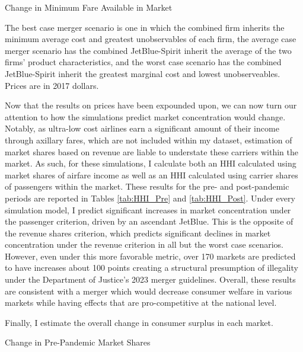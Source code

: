 \documentclass{article}
\begin{document}
    \begin{table}
        \caption{Change in Minimum Fare Available in Market}
        \label{tab:MinimumPrice}
                \vspace{-15mm}
        \begin{center}
            
        \end{center}
        \footnotesize{The best case merger scenario is one in which the combined firm inherits the minimum average cost and greatest unobservables of each firm, the average case merger scenario has the combined JetBlue-Spirit inherit the average of the two firms' product characteristics, and the worst case scenario has the combined JetBlue-Spirit inherit the greatest marginal cost and lowest unobserveables. Prices are in 2017 dollars. }
    \end{table}    

    Now that the results on prices have been expounded upon, we can now turn our attention to how the simulations predict market concentration would change. Notably, as ultra-low cost airlines earn a significant amount of their income through axillary fares, which are not included within my dataset, estimation of market shares based on revenue are liable to understate these carriers within the market. As such, for these simulations, I calculate both an HHI calculated using market shares of airfare income as well as an HHI calculated using carrier shares of passengers within the market. These results for the pre- and post-pandemic periods are reported in Tables \ref{tab:HHI_Pre} and \ref{tab:HHI_Post}. Under every simulation model, I predict significant increases in market concentration under the passenger criterion, driven by an ascendant JetBlue. This is the opposite of the revenue shares criterion, which predicts significant declines in market concentration under the revenue criterion in all but the worst case scenarios. However, even under this more favorable metric, over 170 markets are predicted to have increases about 100 points creating a structural presumption of illegality under the Department of Justice's 2023 merger guidelines. Overall, these results are consistent with a merger which would decrease consumer welfare in various markets while having effects that are pro-competitive at the national level.  

    Finally, I estimate the overall change in consumer surplus in each market. 

    \begin{table}
        \caption{Change in Pre-Pandemic Market Shares}
        \label{tab:HHI_Pre}
    \vspace{-15mm}
        \begin{center}

        \end{center}
    \end{table}
    
\end{document}

